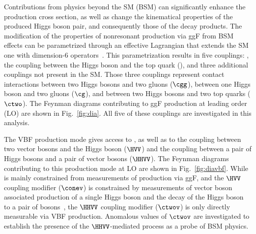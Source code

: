 \documentclass[11pt,a4paper,cmspaper,final,collab]{cms-tdr}
\begin{document}
Contributions from physics beyond the SM (BSM) can 
significantly enhance the \HH production cross section, as well as change the kinematical properties 
of the produced Higgs boson pair, and consequently those of the decay products.
 The modification of the properties of nonresonant \HH production via ggF from BSM effects can be parametrized through an effective Lagrangian that extends the SM one with dimension-6 operators~\cite{deFlorian:2016spz}. This parametrization results in five couplings: \lbdHHH, the coupling between the Higgs boson and the top quark (\yt), and three additional couplings not present in the SM. Those three couplings represent contact interactions between two Higgs bosons and two gluons ($\cgg$), between one Higgs boson and two gluons ($\cg$), and between two Higgs bosons and two top quarks ($\ctwo$). The Feynman diagrams contributing to ggF \HH production at leading order (LO) are shown in Fig.~\ref{fig:dia}. All five of these couplings are investigated in this analysis.

The VBF \HH production mode gives access to \lbdHHH, as well as to the coupling between two vector bosons and the Higgs boson ($\HVV$) and the coupling between a pair of Higgs bosons and a pair of vector bosons ($\HHVV$). The Feynman diagrams contributing to this production mode at LO are shown in Fig.~\ref{fig:diavbf}. While \lbdHHH is mainly constrained from measurements of \HH production via ggF, and the $\HVV$ coupling modifier ($\conev$) is constrained by measurements of vector boson associated production of a single Higgs boson and the decay of the Higgs boson to a pair of bosons~\cite{Sirunyan:2018koj}, the $\HHVV$ coupling modifier ($\ctwov$) is only directly measurable via VBF \HH production. Anomalous values of $\ctwov$ are investigated to establish the presence of the $\HHVV$-mediated process as a probe of BSM physics.
\end{document}
